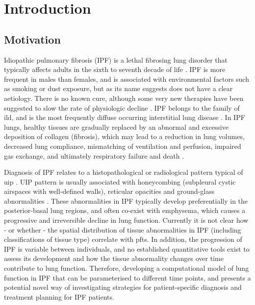 \chapter{Introduction} \label{Yuwen_Introduction}
\section{Motivation}
Idiopathic pulmonary fibrosis (IPF) is a lethal fibrosing lung disorder that typically affects adults in the sixth to seventh decade of life \citep{meltzer2008idiopathic,king2011idiopathic}. IPF is more frequent in males than females, and is associated with environmental factors such as smoking or dust exposure, but as its name suggests does not have a clear aetiology. There is no known cure, although some very new therapies have been suggested to slow the rate of physiologic decline \citep{raghu2011official}. IPF belongs to the family of \gls{ild}, and is the most frequently diffuse occurring interstitial lung disease \citep{meltzer2008idiopathic}. In IPF lungs, healthy tissues are gradually replaced by an abnormal and excessive deposition of collagen (fibrosis), which may lead to a reduction in lung volumes, decreased lung compliance, mismatching of ventilation and perfusion, impaired gas exchange, and ultimately respiratory failure and death \citep{richeldi2017idiopathic}.

Diagnosis of IPF relates to a histopathological or radiological pattern typical of \gls{uip} \citep{raghu2011official,xaubet2017idiopathic}. UIP pattern is usually associated with honeycombing (subpleural cystic airspaces with well-defined walls),  reticular opacities and ground-glass abnormalities \citep{raghu2011official,richeldi2017idiopathic}. These abnormalities in IPF typically develop preferentially in the posterior-basal lung regions, and often co-exist with emphysema, which causes a progressive and irreversible decline in lung function. Currently it is not clear how - or whether - the spatial distribution of tissue abnormalities in IPF (including classifications of tissue type) correlate with \gls{pfts}. In addition, the progression of IPF is variable between individuals, and no established quantitative tools exist to assess its development and how the tissue abnormality changes over time contribute to lung function. Therefore, developing a computational model of lung function in IPF that can be parameterised to different time points, and presents a potential novel way of investigating strategies for patient-specific diagnosis and treatment planning for IPF patients.

